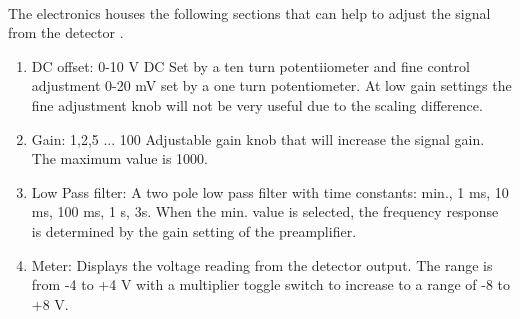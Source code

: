 \documentclass[twocolumn]{article}
\begin{document}
\\
The electronics houses the following sections that can help to adjust the 
signal from the detector \cite{ref:3}.
\begin{enumerate}[label=\alph*).]
\item DC offset: 0-10 V DC Set by a ten turn potentiiometer and fine control 
adjustment 0-20 mV set by a one turn potentiometer. At low gain settings the 
fine adjustment knob will not be very useful due to the scaling difference.
\item Gain: 1,2,5 ... 100 Adjustable gain knob that will increase the signal 
gain. The maximum value is 1000.
\item Low Pass filter: A two pole low pass filter with time constants: min., 
1 ms, 10 ms, 100 ms, 1 s, 3s. When the min. value is selected, the frequency 
response is determined by the gain setting of the preamplifier.
\item Meter: Displays the voltage reading from the detector output. The range 
is from -4 to +4 V with a multiplier toggle switch to increase to a range of 
-8 to +8 V.
\end{enumerate}
\end{document}
